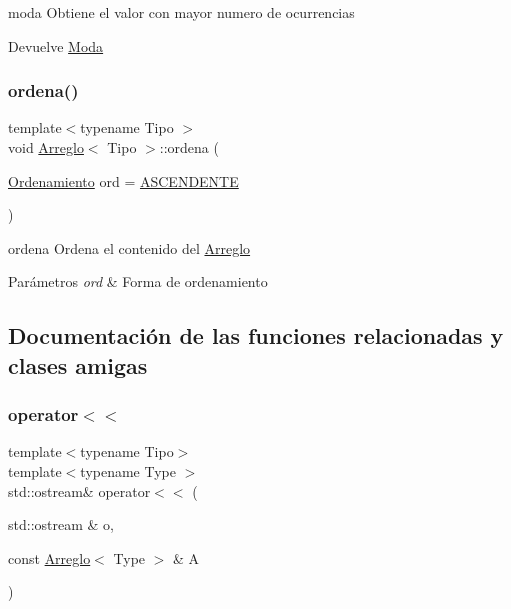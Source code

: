 moda Obtiene el valor con mayor numero de ocurrencias 

\begin{DoxyReturn}{Devuelve}
\hyperlink{struct_moda}{Moda} 
\end{DoxyReturn}
\mbox{\label{class_arreglo_ac1e8f3ecec261c1829257e144d67e4f7}} 
\subsubsection{\texorpdfstring{ordena()}{ordena()}}
{\footnotesize\ttfamily template$<$typename Tipo $>$ \\
void \hyperlink{class_arreglo}{Arreglo}$<$ Tipo $>$\+::ordena (\begin{DoxyParamCaption}\item[{\hyperlink{arreglo_8h_a19d29c5392079f801023ed938d9ce2d6}{Ordenamiento}}]{ord = {\ttfamily \hyperlink{arreglo_8h_a19d29c5392079f801023ed938d9ce2d6a81a8a96faa5cc685dadc157583300652}{A\+S\+C\+E\+N\+D\+E\+N\+TE}} }\end{DoxyParamCaption})}



ordena Ordena el contenido del \hyperlink{class_arreglo}{Arreglo} 


\begin{DoxyParams}{Parámetros}
{\em ord} & Forma de ordenamiento \\
\hline
\end{DoxyParams}


\subsection{Documentación de las funciones relacionadas y clases amigas}
\mbox{\label{class_arreglo_adb4a65563738571a30f77e46a3427138}} 
\subsubsection{\texorpdfstring{operator$<$$<$}{operator<<}}
{\footnotesize\ttfamily template$<$typename Tipo$>$ \\
template$<$typename Type $>$ \\
std\+::ostream\& operator$<$$<$ (\begin{DoxyParamCaption}\item[{std\+::ostream \&}]{o,  }\item[{const \hyperlink{class_arreglo}{Arreglo}$<$ Type $>$ \&}]{A }\end{DoxyParamCaption})\hspace{0.3cm}{\ttfamily [friend]}}




